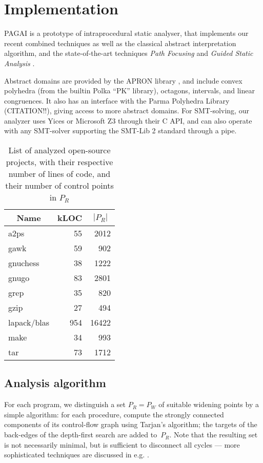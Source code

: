 \documentclass{entcs}
\begin{document}
\section{Implementation}

PAGAI is a prototype of intraprocedural static analyser, that implements our
recent combined techniques \cite{Henry_Monniaux_Moy_SAS12}
as well as the classical abstract interpretation algorithm, and the state-of-the-art
techniques \emph{Path Focusing} \cite{Monniaux_Gonnord_SAS11} and \emph{Guided
Static Analysis} \cite{DBLP:conf/sas/GopanR07}.

Abstract domains are provided by the APRON library
\citep{DBLP:conf/cav/JeannetM09}, and include convex polyhedra (from the builtin
Polka ``PK'' library), octagons, intervals, and linear congruences. It also has
an interface with the Parma Polyhedra Library (CITATION!!), giving access to
more abstract domains.
For SMT-solving, our analyzer uses Yices
\cite{DBLP:conf/cav/DutertreM06} or Microsoft Z3\cite{DBLP:conf/tacas/MouraB08}
through their C API, and can also operate with any SMT-solver supporting the
SMT-Lib 2 standard \cite{BarST-SMTLIB,BarST-SMT-10} through a pipe.


\begin{table}[!h]
	\tiny
	\centering
\begin{tabular}{|l|r|r|} \hline
	\multicolumn{1}{|c|}{Name} &
        \multicolumn{1}{c|}{kLOC} &
        \multicolumn{1}{c|}{$|P_R|$} \\ \hline
	a2ps & 55 & 2012\\
	gawk & 59 & 902\\ 
	gnuchess & 38 & 1222\\ 
	gnugo & 83 & 2801\\
	grep & 35 & 820\\
	gzip & 27 & 494\\
	lapack/blas & 954 & 16422\\
	make & 34 & 993\\ 
	tar & 73 & 1712\\
	\hline
\end{tabular}
\caption{List of analyzed open-source projects, with their respective number of
lines of code, and their number of control points in $P_R$}
\label{fig:projects}
\end{table}


\subsection{Analysis algorithm}
\label{sec:analysis-algorithm}
For each program, we distinguish a set $P_R = P_W$ of suitable widening points by a simple algorithm: for each procedure, compute the strongly connected components of its control-flow graph using Tarjan's algorithm; the targets of the back-edges of the depth-first search are added to~$P_R$. Note that the resulting set is not necessarily minimal, but is sufficient to disconnect all cycles --- more sophisticated techniques are discussed in e.g. \citet{BourdonclePhd}.
\end{document}
